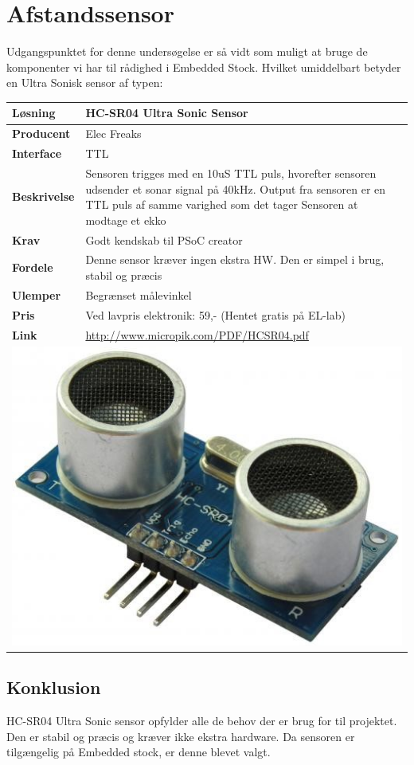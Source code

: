 \section{Afstandssensor}

Udgangspunktet for denne undersøgelse er så vidt som muligt at bruge de komponenter vi har til rådighed i Embedded Stock. Hvilket umiddelbart betyder en Ultra Sonisk sensor af typen:

\begin{table}[H] \centering
\begin{tabular}{|p{3cm}|p{11cm}|}
	\hline
	\textbf{Løsning}		
	    & HC-SR04 Ultra Sonic Sensor
	\\ \hline
	\textbf{Producent} 		
	    & Elec Freaks
	\\ \hline
	\textbf{Interface} 		
	    & TTL
	\\ \hline
	\textbf{Beskrivelse} 	
	    & Sensoren trigges med en 10uS TTL puls, hvorefter sensoren udsender et sonar signal på 40kHz. Output fra sensoren er en TTL puls af samme varighed som det tager Sensoren at modtage et ekko
	\\ \hline
	\textbf{Krav} 			
	    & Godt kendskab til PSoC creator
	\\ \hline
	\textbf{Fordele}		
	    & Denne sensor kræver ingen ekstra HW. Den er simpel i brug, stabil og præcis
	\\ \hline
	\textbf{Ulemper} 		
	    & Begrænset målevinkel
	\\ \hline
	\textbf{Pris} 			
	    & Ved lavpris elektronik: 59,- (Hentet gratis på EL-lab)
	\\ \hline
	\textbf{Link} 			
	    & \url{http://www.micropik.com/PDF/HCSR04.pdf}
	\\ \hline
	\multicolumn{2}{|c|}{\includegraphics[width=0.3\linewidth]{0_Filer/Figuer/Forudundersoegelse/Afstandssensor_billede.jpg}}
    \\ \hline
\end{tabular}
\end{table}

\subsection{Konklusion}

HC-SR04 Ultra Sonic sensor opfylder alle de behov der er brug for til projektet. Den er stabil og præcis og kræver ikke ekstra hardware. Da sensoren er tilgængelig på Embedded stock, er denne blevet valgt.
